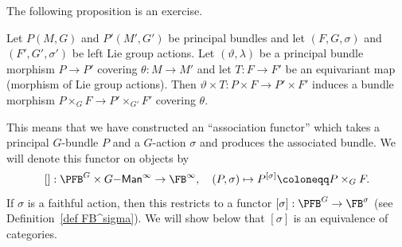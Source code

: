  The following proposition is an exercise.
\begin{prop}[{{\cite[Prop.~1.2.2]{RS2}}}]\label{prop 1.2.2 RS2}
    Let $P(M,G)$ and $P'(M',G')$ be principal bundles and let $(F,G,\sigma)$ and $(F',G',\sigma')$ be left Lie group actions. Let $(\vartheta,\lambda)$ be a principal bundle morphism $P\to P'$ covering $\theta:M\to M'$ and let $T:F\to F'$ be an equivariant map (morphism of Lie group actions). Then $\vartheta\times T:P\times F\to P'\times F'$ induces a bundle morphism $P\times_G F\to P'\times_{G'} F'$ covering $\theta$.
\end{prop}

This means that we have constructed an ``association functor'' which takes a principal $G$-bundle $P$ and a $G$-action $\sigma$ and produces the associated bundle. We will denote this functor on objects by
\[[]:\PFB^G\times G\mathsf{-Man}^\infty \to \FB^\infty,\quad (P,\sigma)\mapsto P^{[\sigma]}\coloneqq P\times_G F.\]
If $\sigma$ is a faithful action, then this restricts to a functor
$[\sigma]:\PFB^G\to \FB^\sigma$ (see Definition~\ref{def FB^sigma}). We will show below that $[\sigma]$ is an equivalence of categories.

